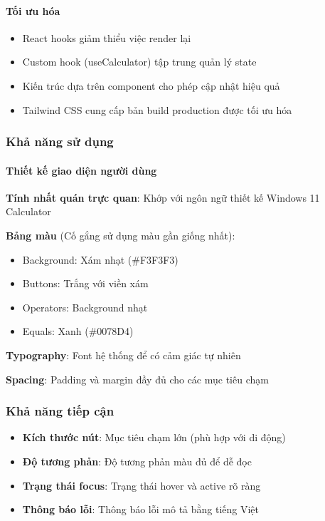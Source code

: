 \paragraph{Tối ưu hóa}
\begin{itemize}
    \item React hooks giảm thiểu việc render lại
    \item Custom hook (useCalculator) tập trung quản lý state
    \item Kiến trúc dựa trên component cho phép cập nhật hiệu quả
    \item Tailwind CSS cung cấp bản build production được tối ưu hóa
\end{itemize}

\subsubsection{Khả năng sử dụng}

\paragraph{Thiết kế giao diện người dùng}

\textbf{Tính nhất quán trực quan}: Khớp với ngôn ngữ thiết kế Windows 11 Calculator

\textbf{Bảng màu} (Cố gắng sử dụng màu gần giống nhất):
\begin{itemize}
    \item Background: Xám nhạt (\#F3F3F3)
    \item Buttons: Trắng với viền xám
    \item Operators: Background nhạt
    \item Equals: Xanh (\#0078D4)
\end{itemize}

\textbf{Typography}: Font hệ thống để có cảm giác tự nhiên

\textbf{Spacing}: Padding và margin đầy đủ cho các mục tiêu chạm

\subsubsection{Khả năng tiếp cận}
\begin{itemize}
    \item \textbf{Kích thước nút}: Mục tiêu chạm lớn (phù hợp với di động)
    \item \textbf{Độ tương phản}: Độ tương phản màu đủ để dễ đọc
    \item \textbf{Trạng thái focus}: Trạng thái hover và active rõ ràng
    \item \textbf{Thông báo lỗi}: Thông báo lỗi mô tả bằng tiếng Việt
\end{itemize}


